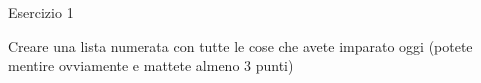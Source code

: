 \begin{frame}{Esercizio 1}

Creare una lista numerata con tutte le cose che avete imparato oggi (potete
mentire ovviamente e mattete almeno 3 punti)

\end{frame}